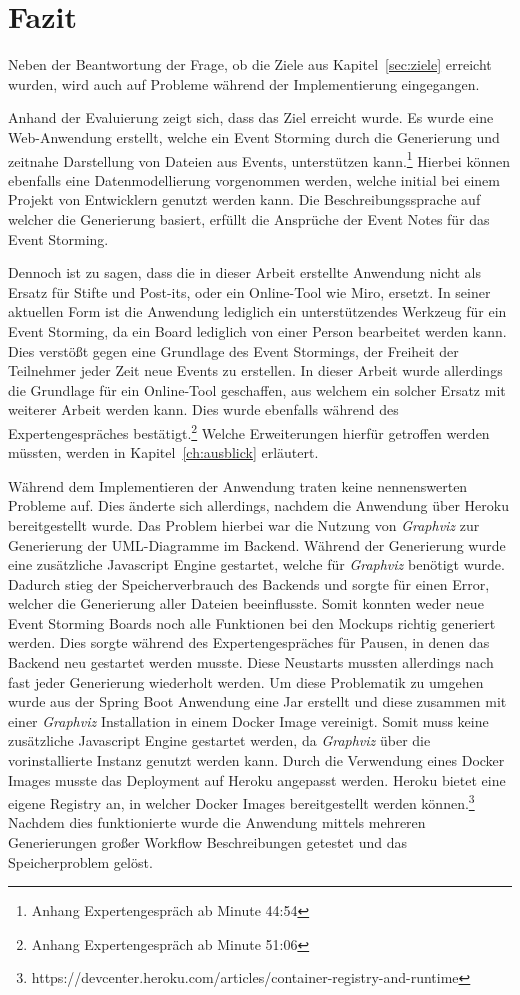 \chapter{Fazit}\label{ch:fazit}
Neben der Beantwortung der Frage, ob die Ziele aus Kapitel~\ref{sec:ziele} erreicht wurden, wird auch auf Probleme während
der Implementierung eingegangen.

Anhand der Evaluierung zeigt sich, dass das Ziel erreicht wurde.
Es wurde eine Web-Anwendung erstellt, welche ein Event Storming durch die Generierung und zeitnahe Darstellung von Dateien aus Events, unterstützen kann.\footnote{Anhang Expertengespräch ab Minute 44:54}
Hierbei können ebenfalls eine Datenmodellierung vorgenommen werden, welche initial bei einem Projekt von Entwicklern genutzt werden kann.
Die Beschreibungssprache auf welcher die Generierung basiert, erfüllt die Ansprüche der Event Notes für das Event Storming.

Dennoch ist zu sagen, dass die in dieser Arbeit erstellte Anwendung nicht als Ersatz für Stifte und Post-its, oder ein Online-Tool wie Miro, ersetzt.
In seiner aktuellen Form ist die Anwendung lediglich ein unterstützendes Werkzeug für ein Event Storming, da ein Board lediglich von einer Person bearbeitet werden kann.
Dies verstößt gegen eine Grundlage des Event Stormings, der Freiheit der Teilnehmer jeder Zeit neue Events zu erstellen.
In dieser Arbeit wurde allerdings die Grundlage für ein Online-Tool geschaffen, aus welchem ein solcher Ersatz mit weiterer Arbeit werden kann.
Dies wurde ebenfalls während des Expertengespräches bestätigt.\footnote{Anhang Expertengespräch ab Minute 51:06}
Welche Erweiterungen hierfür getroffen werden müssten, werden in Kapitel~\ref{ch:ausblick} erläutert.

Während dem Implementieren der Anwendung traten keine nennenswerten Probleme auf.
Dies änderte sich allerdings, nachdem die Anwendung über Heroku bereitgestellt wurde.
Das Problem hierbei war die Nutzung von \textit{Graphviz} zur Generierung der UML-Diagramme im Backend.
Während der Generierung wurde eine zusätzliche Javascript Engine gestartet, welche für \textit{Graphviz} benötigt wurde.
Dadurch stieg der Speicherverbrauch des Backends und sorgte für einen Error, welcher die Generierung aller Dateien beeinflusste.
Somit konnten weder neue Event Storming Boards noch alle Funktionen bei den Mockups richtig generiert werden.
Dies sorgte während des Expertengespräches für Pausen, in denen das Backend neu gestartet werden musste.
Diese Neustarts mussten allerdings nach fast jeder Generierung wiederholt werden.
Um diese Problematik zu umgehen wurde aus der Spring Boot Anwendung eine Jar erstellt und diese zusammen mit einer \textit{Graphviz} Installation in einem Docker Image
vereinigt.\cite*{size-problem}
Somit muss keine zusätzliche Javascript Engine gestartet werden, da \textit{Graphviz} über die vorinstallierte Instanz genutzt werden kann.
Durch die Verwendung eines Docker Images musste das Deployment auf Heroku angepasst werden.
Heroku bietet eine eigene Registry an, in welcher Docker Images bereitgestellt werden können.\footnote{https://devcenter.heroku.com/articles/container-registry-and-runtime}
Nachdem dies funktionierte wurde die Anwendung mittels mehreren Generierungen großer Workflow Beschreibungen getestet und das Speicherproblem gelöst.
